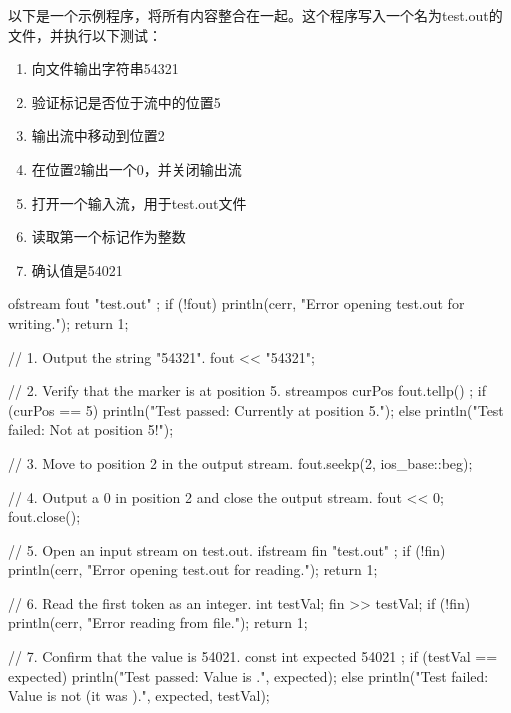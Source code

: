 以下是一个示例程序，将所有内容整合在一起。这个程序写入一个名为test.out的文件，并执行以下测试：

\begin{enumerate}
\item
向文件输出字符串54321

\item
验证标记是否位于流中的位置5

\item
输出流中移动到位置2

\item
在位置2输出一个0，并关闭输出流

\item
打开一个输入流，用于test.out文件

\item
读取第一个标记作为整数

\item
确认值是54021
\end{enumerate}

\begin{cpp}
ofstream fout { "test.out" };
if (!fout) {
    println(cerr, "Error opening test.out for writing.");
    return 1;
}

// 1. Output the string "54321".
fout << "54321";

// 2. Verify that the marker is at position 5.
streampos curPos { fout.tellp() };
if (curPos == 5) {
    println("Test passed: Currently at position 5.");
} else {
    println("Test failed: Not at position 5!");
}

// 3. Move to position 2 in the output stream.
fout.seekp(2, ios_base::beg);

// 4. Output a 0 in position 2 and close the output stream.
fout << 0;
fout.close();

// 5. Open an input stream on test.out.
ifstream fin { "test.out" };
if (!fin) {
    println(cerr, "Error opening test.out for reading.");
    return 1;
}

// 6. Read the first token as an integer.
int testVal;
fin >> testVal;
if (!fin) {
    println(cerr, "Error reading from file.");
    return 1;
}

// 7. Confirm that the value is 54021.
const int expected { 54021 };
if (testVal == expected) {
    println("Test passed: Value is {}.", expected);
} else {
    println("Test failed: Value is not {} (it was {}).", expected, testVal);
}
\end{cpp}


